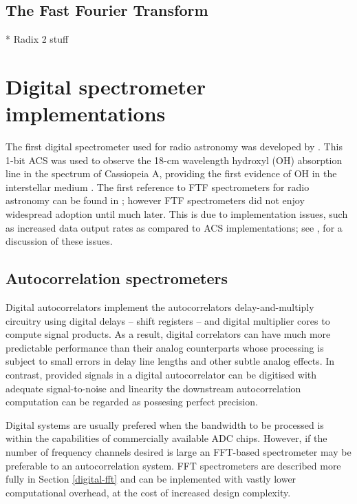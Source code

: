 \documentclass{ws-rv961x669}
\begin{document}
\subsection{The Fast Fourier Transform}

* Radix 2 stuff

\section{Digital spectrometer implementations}

The first digital spectrometer used for radio astronomy was developed
by \citet{Weinreb:1963p10042}. This 1-bit ACS was used to observe
the 18-cm wavelength hydroxyl (OH) absorption line in the spectrum
of Cassiopeia A, providing the first evidence of OH in the interstellar
medium \citep{Weinreb:1963p9992}. The first reference to FTF spectrometers
for radio astronomy can be found in \citet{Chikada:1987p10044}; however
FTF spectrometers did not enjoy widespread adoption until much later.
This is due to implementation issues, such as increased data output
rates as compared to ACS implementations; see \citet{Bunton2000},
for a discussion of these issues.



\subsection{Autocorrelation spectrometers}

Digital autocorrelators implement the autocorrelators delay-and-multiply circuitry using digital delays -- shift registers -- and digital multiplier cores to compute signal products. As a result, digital correlators can have much more predictable performance than their analog counterparts whose processing is subject to small errors in delay line lengths and other subtle analog effects. In contrast, provided signals in a digital autocorrelator can be digitised with adequate signal-to-noise and linearity the downstream autocorrelation computation can be regarded as possesing perfect precision.

Digital systems are usually prefered when the bandwidth to be processed is within the capabilities of commercially available ADC chips. However, if the number of frequency channels desired is large an FFT-based spectrometer may be preferable to an autocorrelation system. FFT spectrometers are described more fully in Section \ref{digital-fft} and can be inplemented with vastly lower computational overhead, at the cost of increased design complexity.
\end{document}
